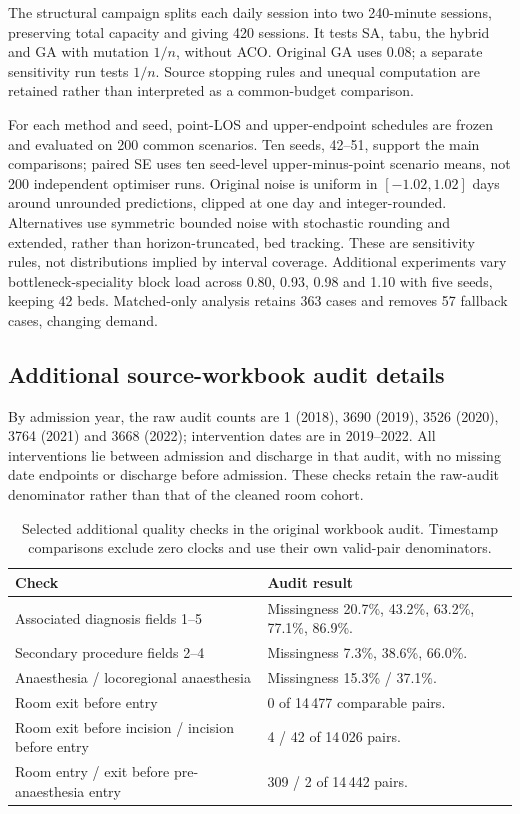 The structural campaign splits each daily session into two 240-minute
sessions, preserving total capacity and giving 420 sessions. It tests SA,
tabu, the hybrid and GA with mutation $1/n$, without ACO. Original GA uses
0.08; a separate sensitivity run tests $1/n$. Source stopping rules and
unequal computation are retained rather than interpreted as a common-budget
comparison.

For each method and seed, point-LOS and upper-endpoint schedules are frozen
and evaluated on 200 common scenarios. Ten seeds, 42--51, support the main
comparisons; paired SE uses ten seed-level upper-minus-point scenario means,
not 200 independent optimiser runs. Original noise is uniform in
$[-1.02,1.02]$ days around unrounded predictions, clipped at one day and
integer-rounded. Alternatives use symmetric bounded noise with stochastic
rounding and extended, rather than horizon-truncated, bed tracking. These
are sensitivity rules, not distributions implied by interval coverage.
Additional experiments vary bottleneck-speciality block load across
0.80, 0.93, 0.98 and 1.10 with five seeds, keeping 42 beds. Matched-only
analysis retains 363 cases and removes 57 fallback cases, changing demand.



\subsection{Additional source-workbook audit details}
\label{sec:data-audit}

By admission year, the raw audit counts are 1 (2018), 3690 (2019),
3526 (2020), 3764 (2021) and 3668 (2022); intervention dates are in 2019--2022.
All interventions lie between admission and discharge in that audit, with
no missing date endpoints or discharge before admission. These checks retain the raw-audit denominator rather than that of the
cleaned room cohort.

\begin{table}[H]
\centering\small
\caption{Selected additional quality checks in the original workbook audit.
Timestamp comparisons exclude zero clocks and use their own valid-pair denominators.}
\label{tab:source-quality}
\begin{tabularx}{\linewidth}{@{}YY@{}}
\toprule
Check & Audit result \\
\midrule
Associated diagnosis fields 1--5 & Missingness 20.7\%, 43.2\%, 63.2\%, 77.1\%, 86.9\%. \\
Secondary procedure fields 2--4 & Missingness 7.3\%, 38.6\%, 66.0\%. \\
Anaesthesia / locoregional anaesthesia & Missingness 15.3\% / 37.1\%. \\
Room exit before entry & 0 of 14\,477 comparable pairs. \\
Room exit before incision / incision before entry & 4 / 42 of 14\,026 pairs. \\
Room entry / exit before pre-anaesthesia entry & 309 / 2 of 14\,442 pairs. \\
\bottomrule
\end{tabularx}
\end{table}

